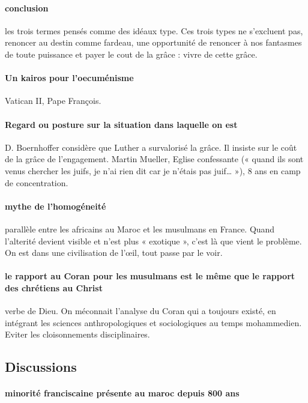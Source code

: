 \paragraph{conclusion} les trois termes pensés comme des idéaux type. Ces trois types ne s’excluent pas, renoncer au destin comme fardeau,  une opportunité de renoncer à nos fantasmes de toute puissance et payer le cout de la grâce : vivre de cette grâce.

\paragraph{Un kairos pour l’oecuménisme} Vatican II, Pape François. 

\paragraph{Regard ou posture sur la situation dans laquelle on est} D. Boernhoffer considère que Luther a survalorisé la grâce. Il insiste sur le coût de la grâce de l’engagement.  Martin Mueller, Eglise confessante (« quand ils sont venus chercher les juifs, je n’ai rien dit car je n’étais pas juif… »), 8 ans en camp de concentration. 

\paragraph{mythe de l’homogéneité} parallèle entre les africains au Maroc et les musulmans en France. Quand l’alterité devient visible et n’est plus « exotique », c’est là que vient le problème. On est dans une civilisation de l’œil, tout passe par le voir. 

\paragraph{le rapport au Coran pour les musulmans est le même que le rapport des chrétiens au Christ} verbe de Dieu. On méconnait l’analyse du Coran qui a toujours existé, en intégrant les sciences anthropologiques et sociologiques au temps mohammedien. Eviter les cloisonnements disciplinaires. 

\subsection{Discussions}

\paragraph{minorité franciscaine présente au maroc depuis 800 ans}

